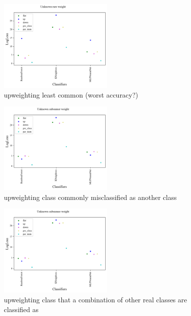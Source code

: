 \begin{figure}
	\begin{center}
		\includegraphics[width=0.5\textwidth]{./fig/systematic_Unknown_rare.png}
		\caption{upweighting least common (worst accuracy?)}
		\label{fig:systematic_rare}
	\end{center}
\end{figure}

\begin{figure}
	\begin{center}
		\includegraphics[width=0.5\textwidth]{./fig/systematic_Unknown_subsumer.png}
		\caption{upweighting class commonly misclassified as another class}
		\label{fig:systematic_subsumer}
	\end{center}
\end{figure}

\begin{figure}
	\begin{center}
		\includegraphics[width=0.5\textwidth]{./fig/systematic_Unknown_subsumee.png}
		\caption{upweighting class that a combination of other real classes are classified as}
		\label{fig:systematic_subsumee}
	\end{center}
\end{figure}

